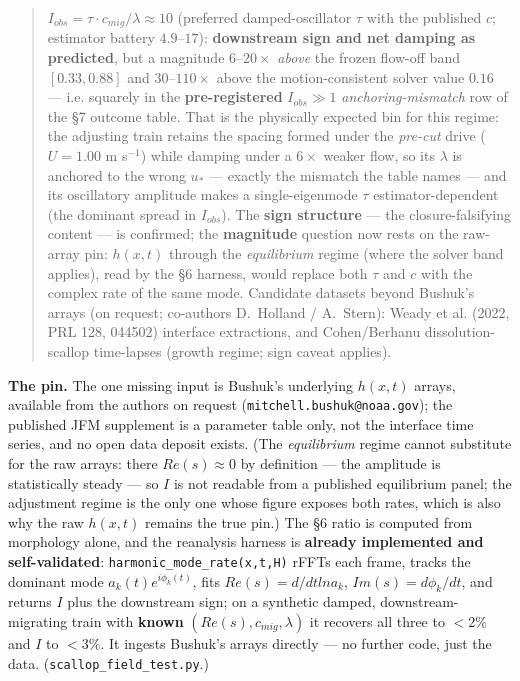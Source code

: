 \documentclass{jfm}
\newcommand{\code}[1]{\texttt{#1}}
\begin{document}
\begin{quote}
$I_{obs} = \tau \cdot c_{mig}/\lambda \approx 10$ (preferred damped-oscillator $\tau $ with the published $c$; estimator battery $4.9–17$): \textbf{downstream sign and net damping as predicted}, but a magnitude $6–20\times $ \emph{above} the frozen flow-off band $[0.33,0.88]$ and $30$–$110\times $ above the motion-consistent solver value $0.16$ — i.e. squarely in the \textbf{pre-registered} $I_{obs}\gg 1$ \emph{anchoring-mismatch} row of the §7 outcome table. That is the physically expected bin for this regime: the adjusting train retains the spacing formed under the \emph{pre-cut} drive ($U=1.00$ m s$^{-1}$) while damping under a $6\times $ weaker flow, so its $\lambda $ is anchored to the wrong $u_{*}$ — exactly the mismatch the table names — and its oscillatory amplitude makes a single-eigenmode $\tau $ estimator-dependent (the dominant spread in $I_{obs}$). The \textbf{sign structure} — the closure-falsifying content — is confirmed; the \textbf{magnitude} question now rests on the raw-array pin: $h(x,t)$ through the \emph{equilibrium} regime (where the solver band applies), read by the §6 harness, would replace both $\tau $ and $c$ with the complex rate of the same mode. Candidate datasets beyond Bushuk's arrays (on request; co-authors D.~Holland / A.~Stern): Weady et al. (2022, PRL 128, 044502) interface extractions, and Cohen/Berhanu dissolution-scallop time-lapses (growth regime; sign caveat applies).
\end{quote}


\textbf{The pin.} The one missing input is Bushuk's underlying $h(x,t)$ arrays, available from the authors on request (\code{mitchell.\allowbreak{}bushuk@noaa.\allowbreak{}gov}); the published JFM supplement is a parameter table only, not the interface time series, and no open data deposit exists. (The \emph{equilibrium} regime cannot substitute for the raw arrays: there $Re(s)\approx 0$ by definition — the amplitude is statistically steady — so $I$ is not readable from a published equilibrium panel; the adjustment regime is the only one whose figure exposes both rates, which is also why the raw $h(x,t)$ remains the true pin.) The §6 ratio is computed from morphology alone, and the reanalysis harness is \textbf{already implemented and self-validated}: \code{harmonic\_\allowbreak{}mode\_\allowbreak{}rate(x,t,H)} rFFTs each frame, tracks the dominant mode $a_{k}(t)e^{i\phi _{k}(t)}$, fits $Re(s)=d/dt ln a_{k}$, $Im(s)=d\phi _{k}/dt$, and returns $I$ plus the downstream sign; on a synthetic damped, downstream-migrating train with \textbf{known} $(Re(s), c_{mig}, \lambda )$ it recovers all three to $<2\%$ and $I$ to $<3\%$. It ingests Bushuk's arrays directly — no further code, just the data. (\code{scallop\_\allowbreak{}field\_\allowbreak{}test.\allowbreak{}py}.)
\end{document}
